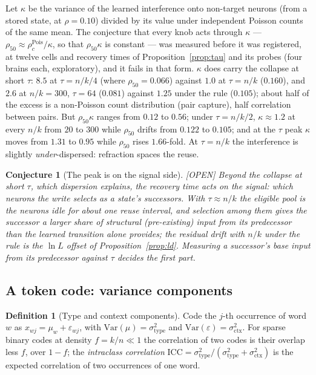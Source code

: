 \documentclass[11pt]{article}
\theoremstyle{definition}
\newtheorem{definition}{Definition}
\theoremstyle{plain}
\newtheorem{conjecture}[lemma]{Conjecture}
\newcommand{\OPEN}{\textnormal{\footnotesize\textsf{[OPEN]}}}
\begin{document}
Let $\kappa$ be the variance of the learned interference onto non-target neurons
(from a stored state, at $\rho = 0.10$) divided by its value under independent
Poisson counts of the same mean. The conjecture that every knob acts through
$\kappa$ --- $\rho_{50} \approx \rho^{\mathrm{Pois}}_c / \kappa$, so that $\rho_{50}\kappa$ is
constant --- was measured before it was registered, at twelve cells and
recovery times of Proposition~\ref{prop:tau} and its probes (four brains each,
exploratory), and it fails in that form. $\kappa$ does carry the collapse at short
$\tau$: $8.5$ at $\tau = n/k/4$ (where $\rho_{50} = 0.066$) against $1.0$ at
$\tau = n/k$ ($0.160$), and $2.6$ at $n/k = 300$, $\tau = 64$ ($0.081$) against
$1.25$ under the rule ($0.105$); about half of the excess is a non-Poisson count
distribution (pair capture), half correlation between pairs. But $\rho_{50}\kappa$
ranges from $0.12$ to $0.56$; under $\tau = n/k/2$, $\kappa \approx 1.2$ at every $n/k$
from $20$ to $300$ while $\rho_{50}$ drifts from $0.122$ to $0.105$; and at the
$\tau$ peak $\kappa$ moves from $1.31$ to $0.95$ while $\rho_{50}$ rises $1.66$-fold.
At $\tau = n/k$ the interference is slightly \emph{under}-dispersed: refraction
spaces the reuse.

\begin{conjecture}[The peak is on the signal side]\label{conj:disp} \OPEN
Beyond the collapse at short $\tau$, which dispersion explains, the recovery
time acts on the \emph{signal}: which neurons the write selects as a state's
successors. With $\tau \approx n/k$ the eligible pool is the neurons idle for
about one reuse interval, and selection among them gives the successor a
larger share of structural (pre-existing) input from its predecessor than the
learned transition alone provides; the residual drift with $n/k$ under the rule
is the $\ln L$ offset of Proposition~\ref{prop:ld}. Measuring a successor's
base input from its predecessor against $\tau$ decides the first part.
\end{conjecture}

\subsection{A token code: variance components}

\begin{definition}[Type and context components]
Code the $j$-th occurrence of word $w$ as $x_{wj} = \mu_w + \varepsilon_{wj}$,
with $\mathrm{Var}(\mu) = \sigma^2_{\mathrm{type}}$ and $\mathrm{Var}(\varepsilon) =
\sigma^2_{\mathrm{ctx}}$. For sparse binary codes at density $f = k/n \ll 1$ the
correlation of two codes is their overlap less $f$, over $1 - f$; the
\emph{intraclass correlation} $\mathrm{ICC} = \sigma^2_{\mathrm{type}}/
(\sigma^2_{\mathrm{type}} + \sigma^2_{\mathrm{ctx}})$ is the expected correlation of
two occurrences of one word.
\end{definition}
\end{document}
